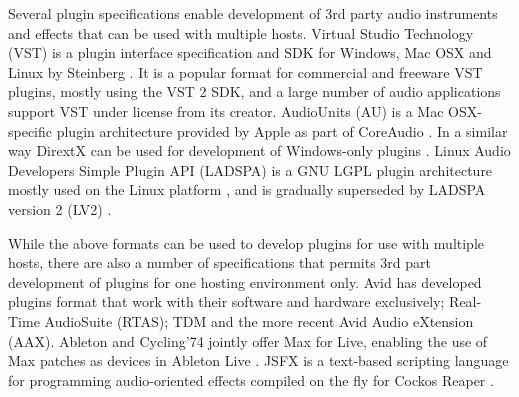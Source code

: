 \documentclass{article}
\begin{document}
Several plugin specifications enable development of 3rd party audio instruments and effects that can be used with multiple hosts.
Virtual Studio Technology (VST) is a plugin interface specification and SDK for Windows, Mac OSX and Linux by Steinberg \cite{steinberg:2014vst}.
It is a popular format for commercial and freeware VST plugins, mostly using the VST 2 SDK, and a large number of audio applications support VST under license from its creator.
AudioUnits (AU) is a Mac OSX-specific plugin architecture provided by Apple as part of CoreAudio \cite{apple2014:au}.
In a similar way DirextX can be used for development of Windows-only plugins \cite{microsoft2014:directX}.
Linux Audio Developers Simple Plugin API (LADSPA) is a GNU LGPL plugin architecture mostly used on the Linux platform \cite{furse:2007ladspa}, and is gradually superseded by LADSPA version 2 (LV2) \cite{lv2:2014}.

While the above formats can be used to develop plugins for use with multiple hosts, there are also a number of specifications that permits 3rd part development of plugins for one hosting environment only.
Avid has developed plugins format that work with their software and hardware exclusively; Real-Time AudioSuite (RTAS); TDM and the more recent Avid Audio eXtension (AAX).
Ableton and Cycling'74 jointly offer Max for Live, enabling the use of Max patches as devices in Ableton Live \cite{ableton:2014maxforlive}. JSFX is a text-based scripting language for programming audio-oriented effects compiled on the fly for Cockos Reaper \cite{cockos:2014jsfx,cockos:2014reaper}.
\end{document}
